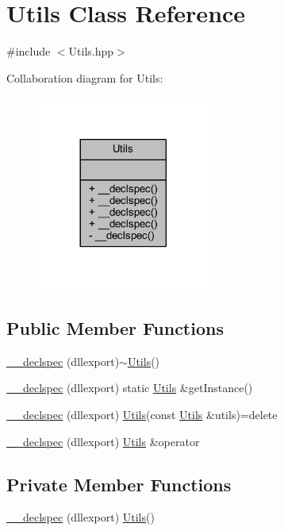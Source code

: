 \hypertarget{class_utils}{\section{Utils Class Reference}
\label{class_utils}
}


{\ttfamily \#include $<$Utils.\-hpp$>$}



Collaboration diagram for Utils\-:\nopagebreak
\begin{figure}[H]
\begin{center}
\leavevmode
\includegraphics[width=161pt]{class_utils__coll__graph}
\end{center}
\end{figure}
\subsection*{Public Member Functions}
\begin{DoxyCompactItemize}
\item 
\hyperlink{class_utils_aec588601f7873778d2f066627a91f33c}{\-\_\-\-\_\-declspec} (dllexport)$\sim$\hyperlink{class_utils}{Utils}()
\item 
\hyperlink{class_utils_a00abc0bf94717df92ff0f43421bbddd5}{\-\_\-\-\_\-declspec} (dllexport) static \hyperlink{class_utils}{Utils} \&get\-Instance()
\item 
\hyperlink{class_utils_a30fe56902037380ae509730ee93cb489}{\-\_\-\-\_\-declspec} (dllexport) \hyperlink{class_utils}{Utils}(const \hyperlink{class_utils}{Utils} \&utils)=delete
\item 
\hyperlink{class_utils_a8ba4fa746c4191f2c5f6293ca1faea6c}{\-\_\-\-\_\-declspec} (dllexport) \hyperlink{class_utils}{Utils} \&operator
\end{DoxyCompactItemize}
\subsection*{Private Member Functions}
\begin{DoxyCompactItemize}
\item 
\hyperlink{class_utils_ad845e5b0fa436d12fcdc14e3d0a064c5}{\-\_\-\-\_\-declspec} (dllexport) \hyperlink{class_utils}{Utils}()
\end{DoxyCompactItemize}


